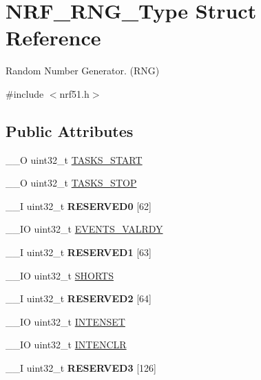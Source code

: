 \hypertarget{struct_n_r_f___r_n_g___type}{}\section{N\+R\+F\+\_\+\+R\+N\+G\+\_\+\+Type Struct Reference}
\label{struct_n_r_f___r_n_g___type}


Random Number Generator. (R\+N\+G)  




{\ttfamily \#include $<$nrf51.\+h$>$}

\subsection*{Public Attributes}
\begin{DoxyCompactItemize}
\item 
\+\_\+\+\_\+\+O uint32\+\_\+t \hyperlink{struct_n_r_f___r_n_g___type_ab230b275569d1d413d82be966086e4ae}{T\+A\+S\+K\+S\+\_\+\+S\+T\+A\+R\+T}
\item 
\+\_\+\+\_\+\+O uint32\+\_\+t \hyperlink{struct_n_r_f___r_n_g___type_a9c451c9b86ef8b05e56ac6d5c05ebc91}{T\+A\+S\+K\+S\+\_\+\+S\+T\+O\+P}
\item 
\hypertarget{struct_n_r_f___r_n_g___type_a9cdb1e4c01e367110b0eab0df66e7558}{}\+\_\+\+\_\+\+I uint32\+\_\+t {\bfseries R\+E\+S\+E\+R\+V\+E\+D0} \mbox{[}62\mbox{]}\label{struct_n_r_f___r_n_g___type_a9cdb1e4c01e367110b0eab0df66e7558}

\item 
\+\_\+\+\_\+\+I\+O uint32\+\_\+t \hyperlink{struct_n_r_f___r_n_g___type_a7d2095d123e89e017d96dbfd88941544}{E\+V\+E\+N\+T\+S\+\_\+\+V\+A\+L\+R\+D\+Y}
\item 
\hypertarget{struct_n_r_f___r_n_g___type_a1b1019c4ba05d5a84449409b49604b31}{}\+\_\+\+\_\+\+I uint32\+\_\+t {\bfseries R\+E\+S\+E\+R\+V\+E\+D1} \mbox{[}63\mbox{]}\label{struct_n_r_f___r_n_g___type_a1b1019c4ba05d5a84449409b49604b31}

\item 
\+\_\+\+\_\+\+I\+O uint32\+\_\+t \hyperlink{struct_n_r_f___r_n_g___type_a693147d6315df821a124d97cf2011efd}{S\+H\+O\+R\+T\+S}
\item 
\hypertarget{struct_n_r_f___r_n_g___type_ae7439a2b69db1bc0d2921c33db0e88fe}{}\+\_\+\+\_\+\+I uint32\+\_\+t {\bfseries R\+E\+S\+E\+R\+V\+E\+D2} \mbox{[}64\mbox{]}\label{struct_n_r_f___r_n_g___type_ae7439a2b69db1bc0d2921c33db0e88fe}

\item 
\+\_\+\+\_\+\+I\+O uint32\+\_\+t \hyperlink{struct_n_r_f___r_n_g___type_ac9f368573a796f1fd35deec344973e67}{I\+N\+T\+E\+N\+S\+E\+T}
\item 
\+\_\+\+\_\+\+I\+O uint32\+\_\+t \hyperlink{struct_n_r_f___r_n_g___type_a815579878334cf55a538a740f2bb6f25}{I\+N\+T\+E\+N\+C\+L\+R}
\item 
\hypertarget{struct_n_r_f___r_n_g___type_ab6e45878d858b661faba89efe122743e}{}\+\_\+\+\_\+\+I uint32\+\_\+t {\bfseries R\+E\+S\+E\+R\+V\+E\+D3} \mbox{[}126\mbox{]}\label{struct_n_r_f___r_n_g___type_ab6e45878d858b661faba89efe122743e}


\end{DoxyCompactItemize}
